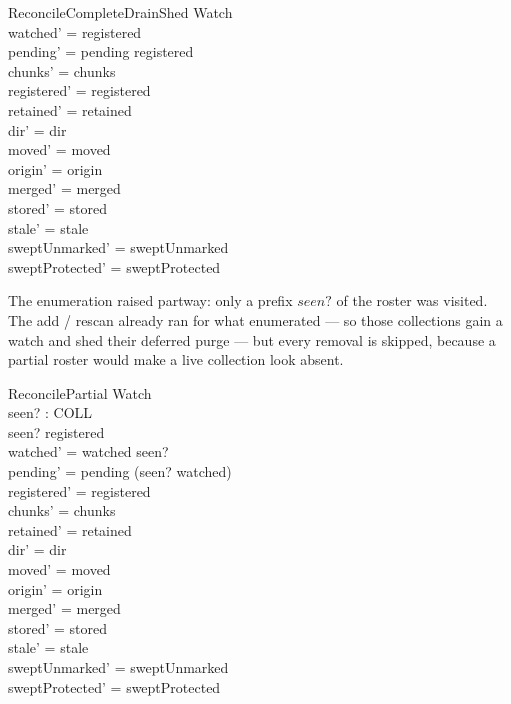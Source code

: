 \documentclass[a4paper]{article}
\begin{document}
\begin{schema}{ReconcileCompleteDrainShed}
  \Delta Watch \\
  \where
  watched' = registered \\
  pending' = pending \setminus registered \\
  chunks' = chunks \\
  registered' = registered \\
  retained' = retained \\
  dir' = dir \\
  moved' = moved \\
  origin' = origin \\
  merged' = merged \\
  stored' = stored \\
  stale' = stale \\
  sweptUnmarked' = sweptUnmarked \\
  sweptProtected' = sweptProtected
\end{schema}

The enumeration raised partway: only a prefix $seen?$ of the roster was visited.
The add / rescan already ran for what enumerated --- so those collections gain a
watch and shed their deferred purge --- but every removal is skipped, because a
partial roster would make a live collection look absent.

\begin{schema}{ReconcilePartial}
  \Delta Watch \\
  seen? : \power COLL \\
  \where
  seen? \subseteq registered \\
  watched' = watched \cup seen? \\
  pending' = pending \setminus (seen? \setminus watched) \\
  registered' = registered \\
  chunks' = chunks \\
  retained' = retained \\
  dir' = dir \\
  moved' = moved \\
  origin' = origin \\
  merged' = merged \\
  stored' = stored \\
  stale' = stale \\
  sweptUnmarked' = sweptUnmarked \\
  sweptProtected' = sweptProtected
\end{schema}
\end{document}
